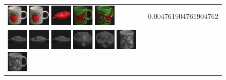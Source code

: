 \begin{figure}[tbp]
\begin{center}
\begin{tabular}{m{11cm} | m{3cm} |}
\includegraphics[width=1cm]{coil/beeld-36.eps}
\includegraphics[width=1cm]{coil/beeld-36.eps}
\includegraphics[width=1cm]{coil/beeld-21.eps}
\includegraphics[width=1cm]{coil/beeld-30.eps}
\includegraphics[width=1cm]{coil/beeld-33.eps}
& {\scriptsize 0.004761904761904762}
\\
\includegraphics[width=1cm]{coil/beeld-24.eps}
\includegraphics[width=1cm]{coil/beeld-27.eps}
\includegraphics[width=1cm]{coil/beeld-24.eps}
\includegraphics[width=1cm]{coil/beeld-28.eps}
\includegraphics[width=1cm]{coil/beeld-26.eps}
\includegraphics[width=1cm]{coil/beeld-52.eps}
\includegraphics[width=1cm]{coil/beeld-48.eps}

\end{tabular}
\end{center}
\end{figure}
